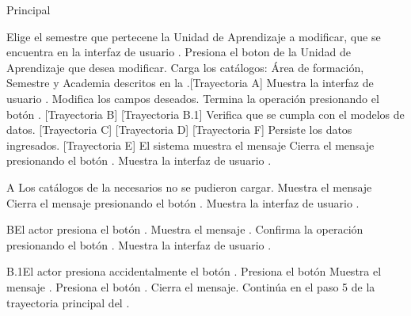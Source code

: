 \begin{UCtrayectoria}{Principal}

	\UCpaso[\UCactor] Elige el semestre que pertecene la Unidad de Aprendizaje a modificar, que se encuentra en la interfaz de usuario .
	\UCpaso[\UCactor] Presiona el boton \BtnLapiz de la Unidad de Aprendizaje que desea modificar.
\UCpaso Carga los catálogos: Área de formación, Semestre y Academia descritos en la .[Trayectoria A]
	\UCpaso Muestra la interfaz de usuario .
	\UCpaso[\UCactor] Modifica los campos deseados.
	\UCpaso[\UCactor] Termina la operación presionando el botón . [Trayectoria B] [Trayectoria B.1]
	\UCpaso Verifica que se cumpla con el modelos de datos. [Trayectoria C] [Trayectoria D] [Trayectoria F]
	\UCpaso Persiste los datos ingresados. [Trayectoria E]
	\UCpaso El sistema muestra el mensaje 
	\UCpaso[\UCactor] Cierra el mensaje presionando el botón .
	\UCpaso Muestra la interfaz de usuario  .
\end{UCtrayectoria}

\begin{UCtrayectoriaA}{A}{ Los catálogos de la  necesarios no se pudieron cargar.}
	\UCpaso Muestra el mensaje 
	\UCpaso[\UCactor] Cierra el mensaje presionando el botón .
	\UCpaso Muestra la interfaz de usuario .
\end{UCtrayectoriaA}

\begin{UCtrayectoriaA}{B}{El actor presiona el botón .}
	\UCpaso Muestra el mensaje .
	\UCpaso[\UCactor] Confirma la operación presionando el botón .
	\UCpaso Muestra la interfaz de usuario .
\end{UCtrayectoriaA}

\begin{UCtrayectoriaA}{B.1}{El actor presiona accidentalmente el botón .}
	\UCpaso[\UCactor] Presiona el botón 
	\UCpaso Muestra el mensaje .
	\UCpaso[\UCactor] Presiona el botón .
	\UCpaso Cierra el mensaje.
	\UCpaso Continúa en el paso 5 de la trayectoria principal del .
\end{UCtrayectoriaA}

